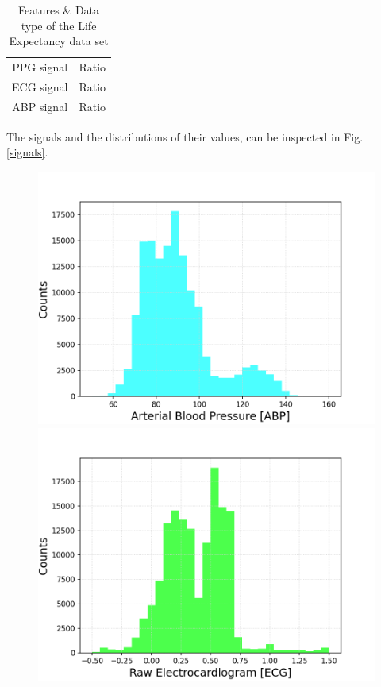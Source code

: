 \documentclass{article}
\begin{document}
\begin{table}
	\centering
	\begin{tabular}{ c c }
		\toprule
		PPG signal & Ratio \\
		ECG signal & Ratio \\
		ABP signal & Ratio \\
		\bottomrule
	\end{tabular}
	\caption{Features \& Data type of the Life Expectancy data set}
	\label{tab:bloodPress}
\end{table}

The signals and the distributions of their values, can be inspected in Fig. \ref{signals}.


\begin{figure}[h!]
	\centering
	\begin{minipage}[b]{0.32\textwidth}
		\includegraphics[width=\textwidth]{plots/histo_ABP.png}
		
	\end{minipage}
	\begin{minipage}[b]{0.32\textwidth}
		\includegraphics[width=\textwidth]{plots/histo_ECG.png}
		

\end{minipage}
\end{figure}
\end{document}
